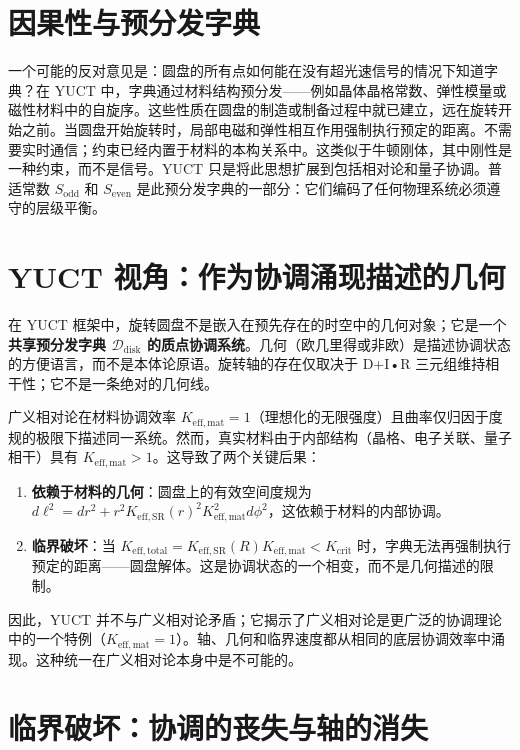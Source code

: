 \documentclass[12pt,a4paper]{article}
\newcommand{\Sodd}{S_{\mathrm{odd}}}
\newcommand{\Seven}{S_{\mathrm{even}}}
\begin{document}
	\section{因果性与预分发字典}
	\label{sec:causality}
	
	一个可能的反对意见是：圆盘的所有点如何能在没有超光速信号的情况下知道字典？在 YUCT 中，字典通过材料结构预分发——例如晶体晶格常数、弹性模量或磁性材料中的自旋序。这些性质在圆盘的制造或制备过程中就已建立，远在旋转开始之前。当圆盘开始旋转时，局部电磁和弹性相互作用强制执行预定的距离。不需要实时通信；约束已经内置于材料的本构关系中。这类似于牛顿刚体，其中刚性是一种约束，而不是信号。YUCT 只是将此思想扩展到包括相对论和量子协调。普适常数 \(\Sodd\) 和 \(\Seven\) 是此预分发字典的一部分：它们编码了任何物理系统必须遵守的层级平衡。
	
	\section{YUCT 视角：作为协调涌现描述的几何}
	
	在 YUCT 框架中，旋转圆盘不是嵌入在预先存在的时空中的几何对象；它是一个\textbf{共享预分发字典 \(\mathcal{D}_{\text{disk}}\) 的质点协调系统}。几何（欧几里得或非欧）是描述协调状态的方便语言，而不是本体论原语。旋转轴的存在仅取决于 D+I•R 三元组维持相干性；它不是一条绝对的几何线。
	
	广义相对论在材料协调效率 \(K_{\mathrm{eff,mat}} = 1\)（理想化的无限强度）且曲率仅归因于度规的极限下描述同一系统。然而，真实材料由于内部结构（晶格、电子关联、量子相干）具有 \(K_{\mathrm{eff,mat}} > 1\)。这导致了两个关键后果：
	
	\begin{enumerate}
		\item \textbf{依赖于材料的几何}：圆盘上的有效空间度规为 \(d\ell^2 = dr^2 + r^2 K_{\mathrm{eff,SR}}(r)^2 K_{\mathrm{eff,mat}}^2 d\phi^2\)，这依赖于材料的内部协调。
		\item \textbf{临界破坏}：当 \(K_{\mathrm{eff,total}} = K_{\mathrm{eff,SR}}(R) K_{\mathrm{eff,mat}} < K_{\mathrm{crit}}\) 时，字典无法再强制执行预定的距离——圆盘解体。这是协调状态的一个相变，而不是几何描述的限制。
	\end{enumerate}
	
	因此，YUCT 并不与广义相对论矛盾；它揭示了广义相对论是更广泛的协调理论中的一个特例（\(K_{\mathrm{eff,mat}}=1\)）。轴、几何和临界速度都从相同的底层协调效率中涌现。这种统一在广义相对论本身中是不可能的。
	
	\section{临界破坏：协调的丧失与轴的消失}
	\label{sec:critical-disruption}
	
\end{document}

